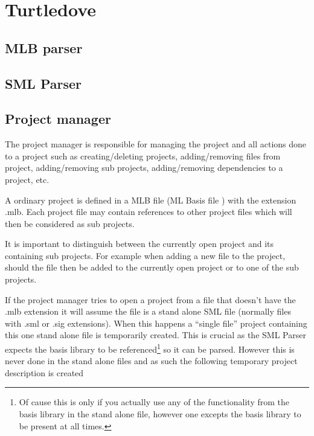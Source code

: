 
\section{Turtledove}
\label{sec:design-turtledove}


\subsection{MLB parser}
\label{sec:design-mlb-parser}

\subsection{SML Parser}
\label{sec:design-sml-parser}


\subsection{Project manager}
\label{sec:design-project-manager}




The project manager is responsible for managing the project and all actions done
to a project such as creating/deleting projects, adding/removing files from
project, adding/removing sub projects, adding/removing dependencies to a
project, etc.

A ordinary project is defined in a MLB file (ML Basis file \cite{mlbasis}) with
the extension .mlb. Each project file may contain references to other project
files which will then be considered as sub projects.

It is important to distinguish between the currently open project and its
containing sub projects. For example when adding a new file to the project,
should the file then be added to the currently open project or to one of the sub
projects.


If the project manager tries to open a project from a file that doesn't have the
.mlb extension it will assume the file is a stand alone SML file (normally files
with .sml or .sig extensions). When this happens a ``single file'' project
containing this one stand alone file is temporarily created. This is crucial as
the SML Parser expects the basis library to be referenced\footnote{Of cause this
  is only if you actually use any of the functionality from the basis library in
  the stand alone file, however one excepts the basis library to be present at
  all times.} so it can be parsed. However this is never done in the stand alone
files and as such the following temporary project description is created

